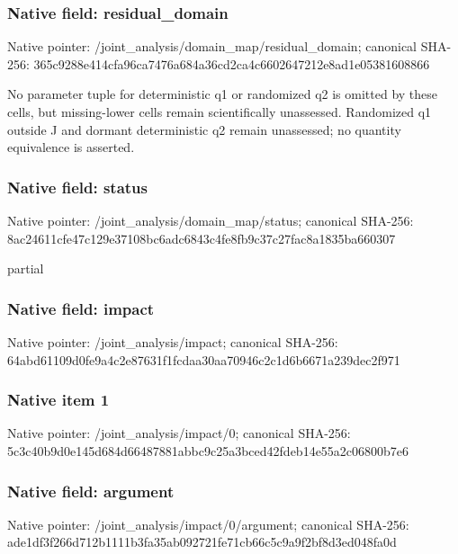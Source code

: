 \documentclass[10pt,a4paper]{article}
\begin{document}
\subsubsection{Native field: residual\_\allowbreak{}domain}
Native pointer: /joint\_\allowbreak{}analysis/domain\_\allowbreak{}map/residual\_\allowbreak{}domain; canonical SHA-256: 365c9288e414cfa96ca7476a684a36cd2ca4c6602647212e8ad1e05381608866

\begingroup\raggedright\sloppy No parameter tuple for deterministic q1 or randomized q2 is omitted by these cells,\allowbreak{} but missing-lower cells remain scientifically unassessed. Randomized q1 outside J and dormant deterministic q2 remain unassessed;\allowbreak{} no quantity equivalence is asserted.\par\endgroup

\subsubsection{Native field: status}
Native pointer: /joint\_\allowbreak{}analysis/domain\_\allowbreak{}map/status; canonical SHA-256: 8ac24611cfe47c129e37108bc6adc6843c4fe8fb9c37c27fac8a1835ba660307

\begingroup\raggedright\sloppy partial\par\endgroup

\subsubsection{Native field: impact}
Native pointer: /joint\_\allowbreak{}analysis/impact; canonical SHA-256: 64abd61109d0fe9a4c2e87631f1fcdaa30aa70946c2c1d6b6671a239dec2f971

\subsubsection{Native item 1}
Native pointer: /joint\_\allowbreak{}analysis/impact/0; canonical SHA-256: 5c3c40b9d0e145d684d66487881abbc9c25a3bced42fdeb14e55a2c06800b7e6

\subsubsection{Native field: argument}
Native pointer: /joint\_\allowbreak{}analysis/impact/0/argument; canonical SHA-256: ade1df3f266d712b1111b3fa35ab092721fe71cb66c5c9a9f2bf8d3ed048fa0d
\end{document}
